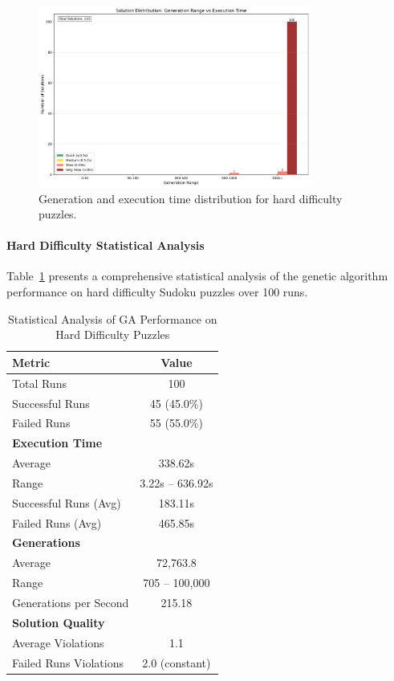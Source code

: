 \begin{figure}[H]
\centering
\includegraphics[width=0.8\textwidth]{resources/generation_execution_time_bars_hard.png}
\caption{Generation and execution time distribution for hard difficulty puzzles.}
\label{fig:generation_execution_time_bars_hard}
\end{figure}

\paragraph{Hard Difficulty Statistical Analysis}

Table~\ref{tab:hard_difficulty_stats} presents a comprehensive statistical analysis of the genetic algorithm performance on hard difficulty Sudoku puzzles over 100 runs.

\begin{table}[H]
\centering
\caption{Statistical Analysis of GA Performance on Hard Difficulty Puzzles}
\label{tab:hard_difficulty_stats}
\begin{tabular}{@{}lc@{}}
\toprule
\textbf{Metric} & \textbf{Value} \\
\midrule
Total Runs & 100 \\
Successful Runs & 45 (45.0\%) \\
Failed Runs & 55 (55.0\%) \\
\midrule
\textbf{Execution Time} & \\
Average & 338.62s \\
Range & 3.22s -- 636.92s \\
Successful Runs (Avg) & 183.11s \\
Failed Runs (Avg) & 465.85s \\
\midrule
\textbf{Generations} & \\
Average & 72,763.8 \\
Range & 705 -- 100,000 \\
Generations per Second & 215.18 \\
\midrule
\textbf{Solution Quality} & \\
Average Violations & 1.1 \\
Failed Runs Violations & 2.0 (constant) \\
\bottomrule
\end{tabular}
\end{table}

